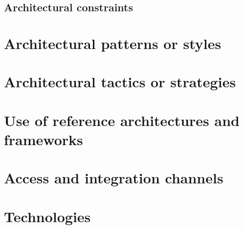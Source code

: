 \documentclass[a4paper,12pt,titlepage]{article}
\begin{document}
\subsection{Architectural constraints}
\newpage
\section{Architectural patterns or styles}
\newpage
\section{Architectural tactics or strategies}
\newpage
\section{Use of reference architectures and frameworks}
\newpage
\section{Access and integration channels}
\newpage
\section{Technologies}
\end{document}

